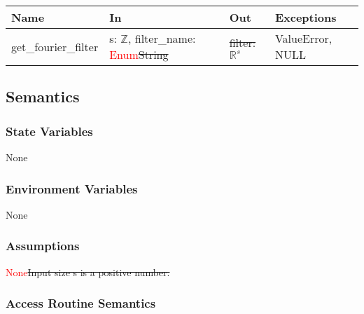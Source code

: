 \documentclass[12pt, titlepage]{article}
\newcommand{\add}{\textcolor{red}}
\begin{document}
\begin{center}
\begin{tabular}{|l|l|l|l|}
\hline
\textbf{Name} & \textbf{In} & \textbf{Out} & \textbf{Exceptions} \\
\hline
get\_fourier\_filter & s: \(\mathbb{Z}\), filter\_name: \add{Enum}\st{String} & \st{filter: }\(\mathbb{R}^{s}\)  & ValueError, NULL \\
\hline
\end{tabular}
\end{center}

\subsection{Semantics}

\subsubsection{State Variables}
None

\subsubsection{Environment Variables}
None

\subsubsection{Assumptions}
\add{None}\st{Input size s is a positive number.}

\subsubsection{Access Routine Semantics}
\end{document}
